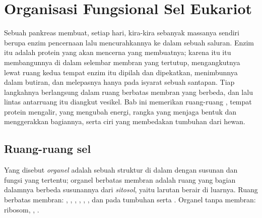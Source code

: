 \chapter{Organisasi Fungsional Sel Eukariot}\label{ch:b1:eukaryotic-cell}

Sebuah  pankreas membuat, setiap hari, kira-kira sebanyak massanya
sendiri berupa enzim pencernaan lalu mencurahkannya ke dalam sebuah
saluran. Enzim itu adalah protein yang akan mencerna  yang
membuatnya; karena itu  itu membangunnya di dalam selembar membran
yang tertutup, mengangkutnya lewat ruang kedua tempat enzim itu dipilah
dan dipekatkan, menimbunnya dalam butiran, dan melepasnya hanya pada
isyarat sebuah santapan. Tiap langkahnya berlangsung dalam ruang
berbatas membran yang berbeda, dan lalu lintas antarruang itu diangkut
vesikel. Bab ini memerikan ruang-ruang , 
tempat protein mengalir,  yang mengubah energi, rangka yang
menjaga bentuk  dan menggerakkan bagiannya, serta ciri yang
membedakan  tumbuhan dari  hewan.

\section{Ruang-ruang sel}

\begin{definition}\label{def:b1:eukaryotic-cell:organelle}
Yang disebut \emph{organel} adalah sebuah struktur di
dalam  dengan susunan dan fungsi yang tertentu; organel berbatas
membran adalah ruang yang bagian dalamnya berbeda susunannya dari
\emph{sitosol}, yaitu larutan berair  di
luarnya. Ruang berbatas membran: , , , , , , dan pada tumbuhan 
serta . Organel tanpa membran: ribosom, , .
\end{definition}

